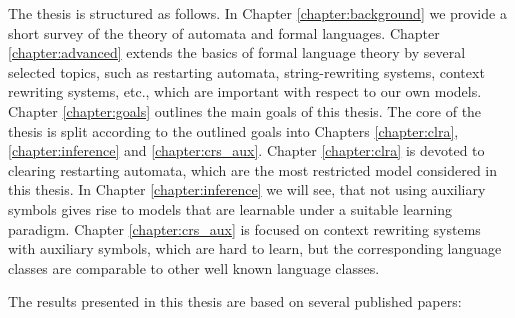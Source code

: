 The thesis is structured as follows. In Chapter \ref{chapter:background} we provide a short survey of the theory of automata and formal languages. Chapter \ref{chapter:advanced} extends the basics of formal language theory by several selected topics, such as restarting automata, string-rewriting systems, context rewriting systems, etc., which are important with respect to our own models. Chapter \ref{chapter:goals} outlines the main goals of this thesis. The core of the thesis is split according to the outlined goals into Chapters \ref{chapter:clra}, \ref{chapter:inference} and \ref{chapter:crs_aux}. Chapter \ref{chapter:clra} is devoted to clearing restarting automata, which are the most restricted model considered in this thesis. In Chapter \ref{chapter:inference} we will see, that not using auxiliary symbols gives rise to models that are learnable under a suitable learning paradigm. Chapter \ref{chapter:crs_aux} is focused on context rewriting systems with auxiliary symbols, which are hard to learn, but the corresponding language classes are comparable to other well known language classes.

The results presented in this thesis are based on several published papers:

